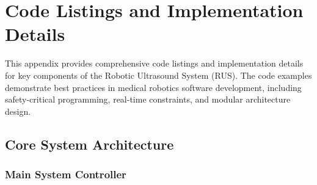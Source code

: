 \appendix

\section{Code Listings and Implementation Details}
\label{app:code-listings}

This appendix provides comprehensive code listings and implementation details for key components of the Robotic Ultrasound System (RUS). The code examples demonstrate best practices in medical robotics software development, including safety-critical programming, real-time constraints, and modular architecture design.

\subsection{Core System Architecture}

\subsubsection{Main System Controller}

